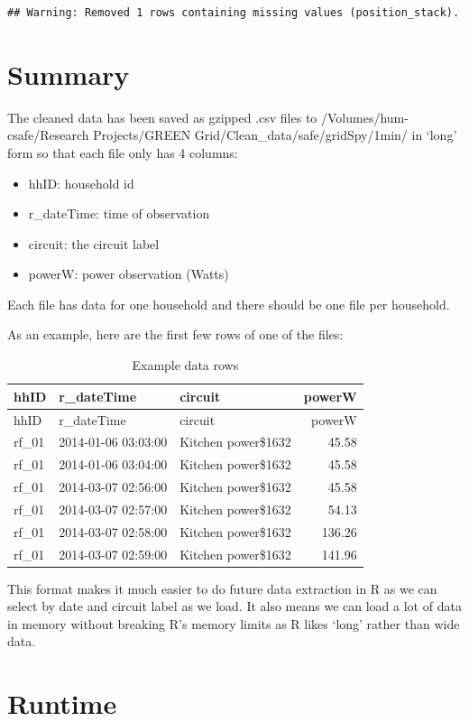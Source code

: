 \documentclass[]{article}
\providecommand{\tightlist}{%
  \setlength{\itemsep}{0pt}\setlength{\parskip}{0pt}}
\begin{document}
\begin{verbatim}
## Warning: Removed 1 rows containing missing values (position_stack).
\end{verbatim}

\section{Summary}\label{summary}

The cleaned data has been saved as gzipped .csv files to
/Volumes/hum-csafe/Research Projects/GREEN
Grid/Clean\_data/safe/gridSpy/1min/ in `long' form so that each file
only has 4 columns:

\begin{itemize}
\tightlist
\item
  hhID: household id
\item
  r\_dateTime: time of observation
\item
  circuit: the circuit label
\item
  powerW: power observation (Watts)
\end{itemize}

Each file has data for one household and there should be one file per
household.

As an example, here are the first few rows of one of the files:

\begin{longtable}[]{@{}lllr@{}}
\caption{Example data rows}\tabularnewline
\toprule
hhID & r\_dateTime & circuit & powerW\tabularnewline
\midrule
\endfirsthead
\toprule
hhID & r\_dateTime & circuit & powerW\tabularnewline
\midrule
\endhead
rf\_01 & 2014-01-06 03:03:00 & Kitchen power\$1632 &
45.58\tabularnewline
rf\_01 & 2014-01-06 03:04:00 & Kitchen power\$1632 &
45.58\tabularnewline
rf\_01 & 2014-03-07 02:56:00 & Kitchen power\$1632 &
45.58\tabularnewline
rf\_01 & 2014-03-07 02:57:00 & Kitchen power\$1632 &
54.13\tabularnewline
rf\_01 & 2014-03-07 02:58:00 & Kitchen power\$1632 &
136.26\tabularnewline
rf\_01 & 2014-03-07 02:59:00 & Kitchen power\$1632 &
141.96\tabularnewline
\bottomrule
\end{longtable}

This format makes it much easier to do future data extraction in R as we
can select by date and circuit label as we load. It also means we can
load a lot of data in memory without breaking R's memory limits as R
likes `long' rather than wide data.

\section{Runtime}\label{runtime}
\end{document}
